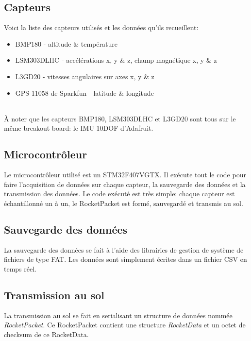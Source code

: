 \subsection{Capteurs}

Voici la liste des capteurs utilisés et les données qu'ils recueillent:
~\\

\begin{itemize}
	\item BMP180 - altitude \& température
	\item LSM303DLHC - accélérations x, y \& z, champ magnétique x, y \& z
	\item L3GD20 - vitesses angulaires sur axes x, y \& z
	\item GPS-11058 de Sparkfun - latitude \& longitude
\end{itemize}

~\\
À noter que les capteurs BMP180, LSM303DLHC et L3GD20 sont tous sur le même
breakout board: le IMU 10DOF d'Adafruit.

\subsection{Microcontrôleur}

Le microcontrôleur utilisé est un STM32F407VGTX. Il exécute tout le code pour
faire l'acquisition de données sur chaque capteur, la sauvegarde des données et
la transmission des données. Le code exécuté est très simple: chaque capteur
est échantillonné un à un, le RocketPacket est formé, sauvegardé et transmis au
sol.

\subsection{Sauvegarde des données}

La sauvegarde des données se fait à l'aide des librairies de gestion de système
de fichiers de type FAT. Les données sont simplement écrites dans un fichier
CSV en temps réel.

\subsection{Transmission au sol}

La transmission au sol se fait en serialisant un structure de données nommée
\textit{RocketPacket}. Ce RocketPacket contient une structure
\textit{RocketData} et un octet de checksum de ce RocketData.


